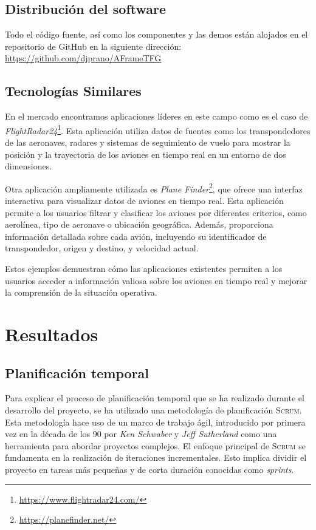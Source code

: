 \documentclass[a4paper, 11pt]{book}
\begin{document}
\section{Distribución del software}
\label{sec:planificacion-temporal}
Todo el código fuente, así como los componentes y las demos están alojados en el repositorio de GitHub en la siguiente dirección: \url{https://github.com/djprano/AFrameTFG}
\section{Tecnologías Similares}
\label{sec:tecnosimilares}
En el mercado encontramos aplicaciones líderes en este campo como es el caso de \emph{FlightRadar24}\footnote{\url{https://www.flightradar24.com/}}. Esta aplicación utiliza datos de fuentes como los transpondedores de las aeronaves, radares y sistemas de seguimiento de vuelo para mostrar la posición y la trayectoria de los aviones en tiempo real en un entorno de dos dimensiones.

Otra aplicación ampliamente utilizada es \emph{Plane Finder}\footnote{\url{https://planefinder.net/}}, que ofrece una interfaz interactiva para visualizar datos de aviones en tiempo real. Esta aplicación permite a los usuarios filtrar y clasificar los aviones por diferentes criterios, como aerolínea, tipo de aeronave o ubicación geográfica. Además, proporciona información detallada sobre cada avión, incluyendo su identificador de transpondedor, origen y destino, y velocidad actual.

Estos ejemplos demuestran cómo las aplicaciones existentes permiten a los usuarios acceder a información valiosa sobre los aviones en tiempo real y mejorar la comprensión de la situación operativa.
\chapter{Resultados}
\label{chap:resultados}
\section{Planificación temporal}
Para explicar el proceso de planificación temporal que se ha realizado durante el desarrollo del proyecto, se ha utilizado una metodología de planificación \textsc{Scrum}.\\
Esta metodología hace uso de un marco de trabajo ágil, introducido por primera vez en la década de los 90 por \emph{Ken Schwaber} y \emph{Jeff Sutherland} como una herramienta para abordar proyectos complejos.
El enfoque principal de \textsc{Scrum} se fundamenta en la realización de iteraciones incrementales. Esto implica dividir el proyecto en tareas más pequeñas y de corta duración conocidas como \emph{sprints}. 
\end{document}
